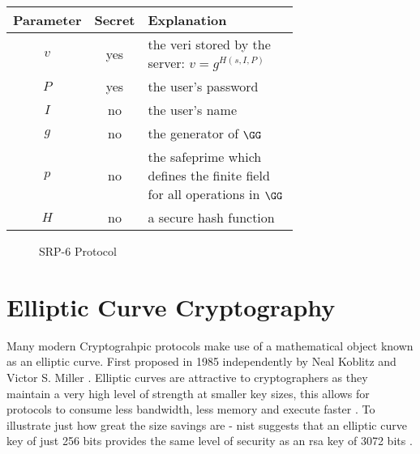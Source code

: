 \begin{center}
  \begin{tabular}{ c c p{0.7\linewidth} }
    \toprule
    Parameter & Secret & Explanation \\
    \midrule
    $v$ & yes & the \gls{veri}\label{text:srp-verifier-generation} stored by the server: $v=g^{H(s,I,P)}$ \\
    $P$ & yes & the user's password \\
    $I$ & no & the user's name \\
    $g$ & no & the generator of $\GG$ \\
    $p$ & no & the \gls{safeprime} which defines the finite field for all operations in $\GG$ \\
    $H$ & no & a secure hash function \\
    \bottomrule
  \end{tabular}
\end{center}

\begin{figure}[H]

  \caption{SRP-6 Protocol}
  \label{fig:srp}
\end{figure}

\clearpage

\section{Elliptic Curve Cryptography}
Many modern Cryptograhpic protocols make use of a mathematical object known as an elliptic curve.
First proposed in 1985 independently by Neal Koblitz \cite{ecc-first-use-koblitz} and Victor S. Miller \cite{ecc-first-use-miller}.
Elliptic curves are attractive to cryptographers as they maintain a very high level of strength at smaller key sizes, this allows for protocols to consume less bandwidth, less memory and execute faster \cite{state-of-ecc}.
To illustrate just how great the size savings are - \gls{nist} suggests that an elliptic curve key of just 256 bits provides the same level of security as an \gls{rsa} key of 3072 bits \cite{nist-ecc-reqs}.

